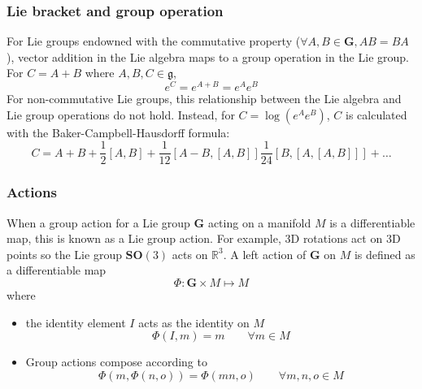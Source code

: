 		\subsubsection{Lie bracket and group operation}			
			For Lie groups endowned with the commutative property ($\forall A,B \in \mathbf{G}, AB = BA$), vector addition in the Lie algebra maps to a group operation in the Lie group. For $C = A + B$ where $A,B,C \in \mathfrak{g}$,
			\begin{equation}
				e^C = e^{A+B} = e^Ae^B
			\end{equation}
			For non-commutative Lie groups, this relationship between the Lie algebra and Lie group operations do not hold. Instead, for $C = \log{\left(e^Ae^B\right)} $, $C$ is calculated with the Baker-Campbell-Hausdorff formula:
			\begin{equation}
				C = A + B + \frac{1}{2}[A,B] + \frac{1}{12}[A-B,[A,B]]  \frac{1}{24}[B,[A,[A,B]]] + \dots
			\end{equation}	
		
		\subsubsection{Actions}
			When a group action for a Lie group $\mathbf{G}$ acting on a manifold $M$ is a differentiable map, this is known as a Lie group action. For example, 3D rotations act on 3D points so the Lie group $\mathbf{SO}(3)$ acts on $\mathbb{R}^3$. A left action of $\mathbf{G}$ on $M$ is defined as a differentiable map
			\begin{equation}
				\Phi: \mathbf{G} \times M \mapsto M
			\end{equation}
			where
			\begin{itemize}
			\item the identity element $I$ acts as the identity on $M$
				\begin{equation}
					\Phi(I,m) = m \hspace{2em} \forall m \in M
				\end{equation}
			\item Group actions compose according to
				\begin{equation}
					\Phi(m,\Phi(n,o)) = \Phi(mn,o) \hspace{2em} \forall m,n,o \in M
				\end{equation}
			\end{itemize}
		
